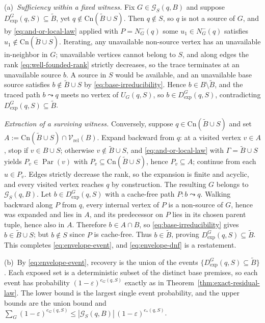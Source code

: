\documentclass[10pt,a4paper]{amsart}
\makeatletter
\newcommand{\Cn}{\text{Cn}}
\renewenvironment{proof}[1][\proofname]{\par
  \pushQED{\qed}%
  \normalfont \topsep6\p@\@plus6\p@\relax
  \trivlist
  \item[\hskip\labelsep
        \itshape
    #1\@addpunct{.}]\ignorespaces
}{%
  \popQED\endtrivlist\@endpefalse
}
\makeatother
\begin{document}
\begin{proof}
(a)\ \emph{Sufficiency within a fixed witness.}
Fix \(G\in\mathcal G_S(q,B)\) and suppose
\(D_{\mathrm{exp}}^{G}(q,S)\subseteq\widetilde B\), yet
\(q\notin\Cn(\widetilde B\cup S)\).  Then \(q\notin S\), so \(q\) is not a
source of \(G\), and by \eqref{eq:and-or-local-law} applied with
\(P=N_G^{-}(q)\) some \(u_1\in N_G^{-}(q)\) satisfies
\(u_1\notin\Cn(\widetilde B\cup S)\).  Iterating, any unavailable non-source
vertex has an unavailable in-neighbor in \(G\); unavailable vertices cannot
belong to \(S\), and along edges the rank \eqref{eq:well-founded-rank}
strictly decreases, so the trace terminates at an unavailable source
\(b\).  A source in \(S\) would be available, and an unavailable base source
satisfies \(b\notin\widetilde B\cup S\) by \eqref{eq:base-irreducibility}.
Hence \(b\in B\setminus\widetilde B\), and the traced path
\(b\leadsto q\) meets no vertex of \(U_G(q,S)\), so
\(b\in D_{\mathrm{exp}}^{G}(q,S)\), contradicting
\(D_{\mathrm{exp}}^{G}(q,S)\subseteq\widetilde B\).

\emph{Extraction of a surviving witness.}
Conversely, suppose \(q\in\Cn(\widetilde B\cup S)\) and set
\(A:=\Cn(\widetilde B\cup S)\cap\mathcal V_{\mathrm{rel}}(B)\).  Expand
backward from \(q\): at a visited vertex \(v\in A\), stop if
\(v\in B\cup S\); otherwise \(v\notin\widetilde B\cup S\), and
\eqref{eq:and-or-local-law} with \(\Gamma=\widetilde B\cup S\) yields
\(P_v\in\operatorname{Par}(v)\) with \(P_v\subseteq\Cn(\widetilde B\cup S)\),
hence \(P_v\subseteq A\); continue from each \(u\in P_v\).  Edges strictly
decrease the rank, so the expansion is finite and acyclic, and every visited
vertex reaches \(q\) by construction.  The resulting \(G\) belongs to
\(\mathcal G_S(q,B)\).  Let \(b\in D_{\mathrm{exp}}^{G}(q,S)\) with a
cache-free path \(P:b\leadsto q\).  Walking backward along \(P\) from \(q\),
every internal vertex of \(P\) is a non-source of \(G\), hence was expanded
and lies in \(A\), and its predecessor on \(P\) lies in its chosen parent
tuple, hence also in \(A\).  Therefore \(b\in A\cap B\), so
\eqref{eq:base-irreducibility} gives \(b\in\widetilde B\cup S\); but
\(b\notin S\) since \(P\) is cache-free.  Thus
\(b\in\widetilde B\), proving
\(D_{\mathrm{exp}}^{G}(q,S)\subseteq\widetilde B\).  This completes
\eqref{eq:envelope-event}, and \eqref{eq:envelope-dnf} is a restatement.

(b)\ By \eqref{eq:envelope-event}, recovery is the union of the events
\(\{D_{\mathrm{exp}}^{G}(q,S)\subseteq\widetilde B\}\).  Each exposed set is
a deterministic subset of the distinct base premises, so each event has
probability \((1-\varepsilon)^{e_G(q,S)}\) exactly as in
Theorem~\ref{thm:exact-residual-law}.  The lower bound is the largest single
event probability, and the upper bounds are the union bound and
\(\sum_G(1-\varepsilon)^{e_G(q,S)}\le|\mathcal G_S(q,B)|\,
(1-\varepsilon)^{e_*(q,S)}\).


\end{proof}
\end{document}

